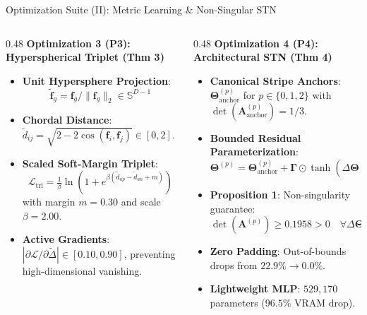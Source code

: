 \documentclass[aspectratio=169,xcolor=dvipsnames]{beamer}
\begin{document}
\begin{frame}{Optimization Suite (II): Metric Learning \& Non-Singular STN}
\footnotesize
\begin{columns}[t,onlytextwidth]
\begin{column}{0.48\textwidth}
    \textbf{Optimization 3 (P3): Hyperspherical Triplet (Thm 3)}
    \begin{itemize}
        \setlength{\itemsep}{0.12em}
        \item \textbf{Unit Hypersphere Projection}:
        $$\tilde{\mathbf{f}}_g = \mathbf{f}_g / \|\mathbf{f}_g\|_2 \in \mathbb{S}^{D-1}$$
        \item \textbf{Chordal Distance}: $\tilde{d}_{ij} = \sqrt{2 - 2\cos(\mathbf{f}_i, \mathbf{f}_j)} \in [0, 2]$.
        \item \textbf{Scaled Soft-Margin Triplet}:
        $$\mathcal{L}_{\text{tri}} = \tfrac{1}{\beta}\ln\left(1 + e^{\beta(\tilde{d}_{ap} - \tilde{d}_{an} + m)}\right)$$
        with margin $m=0.30$ and scale $\beta=2.00$.
        \item \textbf{Active Gradients}: $|\partial \mathcal{L}/\partial \tilde{\Delta}| \in [0.10, 0.90]$, preventing high-dimensional vanishing.
    \end{itemize}
\end{column}
\begin{column}{0.48\textwidth}
    \textbf{Optimization 4 (P4): Architectural STN (Thm 4)}
    \begin{itemize}
        \setlength{\itemsep}{0.12em}
        \item \textbf{Canonical Stripe Anchors}: $\boldsymbol{\Theta}_{\text{anchor}}^{(p)}$ for $p \in \{0, 1, 2\}$ with $\det(\mathbf{A}_{\text{anchor}}^{(p)}) = 1/3$.
        \item \textbf{Bounded Residual Parameterization}:
        $$\boldsymbol{\Theta}^{(p)} = \boldsymbol{\Theta}_{\text{anchor}}^{(p)} + \boldsymbol{\Gamma} \odot \tanh(\Delta \boldsymbol{\Theta}^{(p)})$$
        \item \textbf{Proposition 1}: Non-singularity guarantee:
        $$\det(\mathbf{A}^{(p)}) \ge 0.1958 > 0 \quad \forall \Delta \boldsymbol{\Theta}^{(p)} \in \mathbb{R}^{2 \times 3}$$
        \item \textbf{Zero Padding}: Out-of-bounds drops from $22.9\% \to \mathbf{0.0\%}$.
        \item \textbf{Lightweight MLP}: $529,170$ parameters ($96.5\%$ VRAM drop).
    \end{itemize}
\end{column}
\end{columns}
\end{frame}
\end{document}
